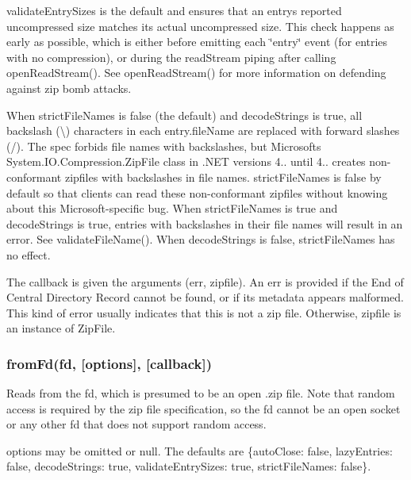 {\ttfamily validate\+Entry\+Sizes} is the default and ensures that an entry\textquotesingle{}s reported uncompressed size matches its actual uncompressed size. This check happens as early as possible, which is either before emitting each {\ttfamily \char`\"{}entry\char`\"{}} event (for entries with no compression), or during the {\ttfamily read\+Stream} piping after calling {\ttfamily open\+Read\+Stream()}. See {\ttfamily open\+Read\+Stream()} for more information on defending against zip bomb attacks.

When {\ttfamily strict\+File\+Names} is {\ttfamily false} (the default) and {\ttfamily decode\+Strings} is {\ttfamily true}, all backslash ({\ttfamily \textbackslash{}}) characters in each {\ttfamily entry.\+file\+Name} are replaced with forward slashes ({\ttfamily /}). The spec forbids file names with backslashes, but Microsoft\textquotesingle{}s {\ttfamily System.\+I\+O.\+Compression.\+Zip\+File} class in .N\+ET versions 4.. until 4.. creates non-\/conformant zipfiles with backslashes in file names. {\ttfamily strict\+File\+Names} is {\ttfamily false} by default so that clients can read these non-\/conformant zipfiles without knowing about this Microsoft-\/specific bug. When {\ttfamily strict\+File\+Names} is {\ttfamily true} and {\ttfamily decode\+Strings} is {\ttfamily true}, entries with backslashes in their file names will result in an error. See {\ttfamily validate\+File\+Name()}. When {\ttfamily decode\+Strings} is {\ttfamily false}, {\ttfamily strict\+File\+Names} has no effect.

The {\ttfamily callback} is given the arguments {\ttfamily (err, zipfile)}. An {\ttfamily err} is provided if the End of Central Directory Record cannot be found, or if its metadata appears malformed. This kind of error usually indicates that this is not a zip file. Otherwise, {\ttfamily zipfile} is an instance of {\ttfamily Zip\+File}.

\subsubsection*{from\+Fd(fd, \mbox{[}options\mbox{]}, \mbox{[}callback\mbox{]})}

Reads from the fd, which is presumed to be an open .zip file. Note that random access is required by the zip file specification, so the fd cannot be an open socket or any other fd that does not support random access.

{\ttfamily options} may be omitted or {\ttfamily null}. The defaults are {\ttfamily \{auto\+Close\+: false, lazy\+Entries\+: false, decode\+Strings\+: true, validate\+Entry\+Sizes\+: true, strict\+File\+Names\+: false\}}.

